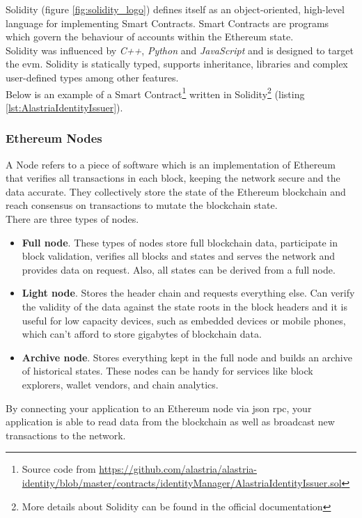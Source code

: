 Solidity (figure \ref{fig:solidity_logo}) defines itself as an object-oriented, high-level language for implementing Smart Contracts. Smart Contracts are programs which govern the behaviour of accounts within the Ethereum state.\\

Solidity\cite{solidityGit} was influenced by \textit{C++}, \textit{Python} and \textit{JavaScript} and is designed to target the \acrfull{evm}. Solidity is statically typed, supports inheritance, libraries and complex user-defined types among other features.\\

Below is an example of a Smart Contract\footnote{Source code from \url{https://github.com/alastria/alastria-identity/blob/master/contracts/identityManager/AlastriaIdentityIssuer.sol}} written in Solidity\footnote{More details about Solidity can be found in the official documentation\cite{solidity}} (listing  \ref{lst:AlastriaIdentityIssuer}).



\subsubsection{Ethereum Nodes}
A Node refers to a piece of software which is an implementation of Ethereum that verifies all transactions in each block, keeping the network secure and the data accurate. They collectively store the state of the Ethereum blockchain and reach consensus on transactions to mutate the blockchain state.\\

There are three types of nodes.
\begin{itemize}
    \item \textbf{Full node}. These types of nodes store full blockchain data, participate in block validation, verifies all blocks and states and serves the network and provides data on request. Also, all states can be derived from a full node.
    \item \textbf{Light node}. Stores the header chain and requests everything else. Can verify the validity of the data against the state roots in the block headers and it is useful for low capacity devices, such as embedded devices or mobile phones, which can't afford to store gigabytes of blockchain data.
    \item \textbf{Archive node}. Stores everything kept in the full node and builds an archive of historical states. These nodes can be handy for services like block explorers, wallet vendors, and chain analytics.
\end{itemize}
By connecting your application to an Ethereum node via \acrshort{json} \acrshort{rpc}, your application is able to read data from the blockchain as well as broadcast new transactions to the network.

